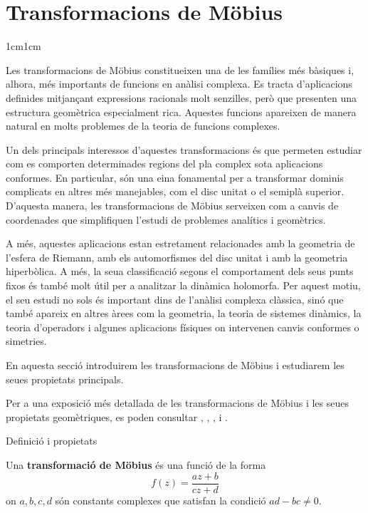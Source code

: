 \section{Transformacions de Möbius}

\begin{adjustwidth}{1cm}{1cm}

    Les transformacions de Möbius constitueixen una de les famílies més bàsiques i, alhora, més importants de funcions en anàlisi complexa. Es tracta d'aplicacions definides mitjançant expressions racionals molt senzilles, però que presenten una estructura geomètrica especialment rica. Aquestes funcions apareixen de manera natural en molts problemes de la teoria de funcions complexes.

    Un dels principals interessos d'aquestes transformacions és que permeten estudiar com es comporten determinades regions del pla complex sota aplicacions conformes. En particular, són una eina fonamental per a transformar dominis complicats en altres més manejables, com el disc unitat o el semiplà superior. D'aquesta manera, les transformacions de Möbius serveixen com a canvis de coordenades que simplifiquen l'estudi de problemes analítics i geomètrics.

    A més, aquestes aplicacions estan estretament relacionades amb la geometria de l'esfera de Riemann, amb els automorfismes del disc unitat i amb la geometria hiperbòlica. A més, la seua classificació segons el comportament dels seus punts fixos és també molt útil per a analitzar la dinàmica holomorfa. Per aquest motiu, el seu estudi no sols és important dins de l'anàlisi complexa clàssica, sinó que també apareix en altres àrees com la geometria, la teoria de sistemes dinàmics, la teoria d'operadors i algunes aplicacions físiques on intervenen canvis conformes o simetries.

    En aquesta secció introduirem les transformacions de Möbius i estudiarem les seues propietats principals.

    Per a una exposició més detallada de les transformacions de Möbius i les seues propietats geomètriques, es poden consultar \cite[Cap. 3, Secció 3]{ahlfors}, \cite[Cap. III, Secció 3]{conway}, \cite[Cap. II, Secció 7]{gamelin}, i \cite{needham}.

    \begin{subsection}{Definició i propietats}

    \begin{definicio}
        Una \textbf{transformació de Möbius} és una funció de la forma 
        \begin{equation}
        f(z) = \frac{az + b}{cz + d}
        \label{eq:mobius}
        \end{equation} on $a,b,c,d$ són constants complexes que satisfan la condició $ad-bc \neq 0$. 


\end{definicio}
\end{subsection}
\end{adjustwidth}
